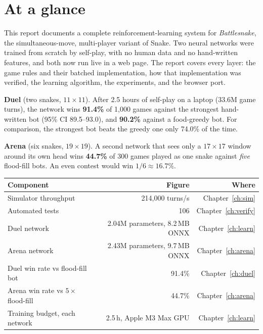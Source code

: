 \documentclass[11pt,openany]{book}
\begin{document}
\chapter*{At a glance}

This report documents a complete reinforcement-learning system for
\emph{Battlesnake}, the simultaneous-move, multi-player variant of Snake. Two neural
networks were trained from scratch by self-play, with no human data and no hand-written
features, and both now run live in a web page. The report covers every layer: the game
rules and their batched implementation, how that implementation was verified, the
learning algorithm, the experiments, and the browser port.

\begin{keybox}
\textbf{Duel} (two snakes, $11\times11$). After 2.5 hours of self-play on a laptop
(33.6M game turns), the network wins \textbf{91.4\%} of 1{,}000 games against the
strongest hand-written bot (95\% CI 89.5--93.0), and \textbf{90.2\%} against a
food-greedy bot. For comparison, the strongest bot beats the greedy one only 74.0\% of the
time.

\textbf{Arena} (six snakes, $19\times19$). A second network that sees only a
$17\times17$ window around its own head wins \textbf{44.7\%} of 300 games played as one
snake against \emph{five} flood-fill bots. An even contest would win
$1/6 \approx 16.7\%$.
\end{keybox}

\begin{center}
\begin{tabular}{@{}lrr@{}}
\toprule
\textbf{Component} & \textbf{Figure} & \textbf{Where}\\
\midrule
Simulator throughput & 214{,}000 turns/s & Chapter~\ref{ch:sim}\\
Automated tests & 106 & Chapter~\ref{ch:verify}\\
Duel network & 2.04M parameters, 8.2\,MB ONNX & Chapter~\ref{ch:learn}\\
Arena network & 2.43M parameters, 9.7\,MB ONNX & Chapter~\ref{ch:arena}\\
Duel win rate vs flood-fill bot & 91.4\% & Chapter~\ref{ch:duel}\\
Arena win rate vs $5\times$ flood-fill & 44.7\% & Chapter~\ref{ch:arena}\\
Training budget, each network & 2.5\,h, Apple M3 Max GPU & Chapter~\ref{ch:learn}\\
\bottomrule
\end{tabular}
\end{center}
\end{document}
